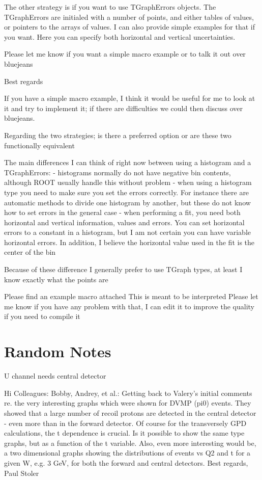 The other strategy is if you want to use TGraphErrors objects. The TGraphErrors are initialed with a number of points, and either tables of values, or pointers to the arrays of values. I can also provide simple examples for that if you want. Here you can specify both horizontal and vertical uncertainties.

Please let me know if you want a simple macro example or to talk it out over bluejeans

Best regards

If you have a simple macro example, I think it would be useful for me to look at it and try to implement it; if there are difficulties we could then discuss over bluejeans.

Regarding the two strategies; is there a preferred option or are these two functionally equivalent


The main differences I can think of right now between using a histogram and a TGraphErrors:
- histograms normally do not have negative bin contents, although ROOT usually handle this without problem
- when using a histogram type you need to make sure you set the errors correctly. For instance there are automatic methods to divide one histogram by another, but these do not know how to set errors in the general case
- when performing a fit, you need both horizontal and vertical information, values and errors. You can set horizontal errors to a constant in a histogram, but I am not certain you can have variable horizontal errors. In addition, I believe the horizontal value used in the fit is the center of the bin

Because of these difference I generally prefer to use TGraph types, at least I know exactly what the points are

Please find an example macro attached
This is meant to be interpreted
Please let me know if you have any problem with that, I can edit it to improve the quality if you need to compile it




\section{Random Notes}
U channel needs central detector

Hi Colleagues: Bobby, Andrey,  et al.:
Getting back to Valery’s initial comments re. the very interesting graphs which were shown for DVMP (pi0) events. They  showed that a large number of  recoil protons are detected in the central detector - even more than in the forward detector. Of course for the transversely GPD calculations, the t dependence is crucial.  Is it possible to show the same type graphs, but as a function of the t variable. Also, even more interesting would be, a two dimensional graphs  showing the distributions of events vs Q2 and t  for a given W, e.g. 3 GeV, for both the forward and central detectors.
Best regards,
Paul Stoler

